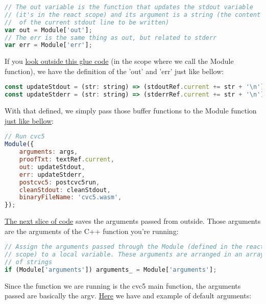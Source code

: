 \documentclass[12pt, a4paper]{article}
\begin{document}
\begin{lstlisting}[language=JavaScript]
// The out variable is the function that updates the stdout variable
// (it's in the react scope) and its argument is a string (the content
//  of the current stdout line to be written)
var out = Module['out'];
// The err is the same thing as out, but related to stderr
var err = Module['err'];
\end{lstlisting}

If you \href{https://github.com/ufmg-smite/proof-visualizer/blob/main/frontend/src/components/VisualizerSmtDrawer/VisualizerSmtDrawer.tsx#L135-L136}{look outside this glue code} (in the scope where we call the Module function), we have the definition of the 'out' and 'err' just like bellow:

\begin{lstlisting}[language=JavaScript]
const updateStdout = (str: string) => (stdoutRef.current += str + '\n');
const updateStderr = (str: string) => (stderrRef.current += str + '\n');
\end{lstlisting}

With that defined, we simply pass those buffer functions to the Module function \href{https://github.com/ufmg-smite/proof-visualizer/blob/main/frontend/src/components/VisualizerSmtDrawer/VisualizerSmtDrawer.tsx#L357-L366}{just like bellow}:
\begin{lstlisting}[language=JavaScript]
// Run cvc5
Module({
    arguments: args,
    proofTxt: textRef.current,
    out: updateStdout,
    err: updateStderr,
    postcvc5: postcvc5run,
    cleanStdout: cleanStdout,
    binaryFileName: 'cvc5.wasm',
});
\end{lstlisting}

\href{https://github.com/ufmg-smite/proof-visualizer/blob/main/frontend/src/wasm/cvc5.js#L124-L127}{The next slice of code} saves the arguments passed from outside. Those arguments are the arguments of the C++ function you're running:

\begin{lstlisting}[language=JavaScript]
// Assign the arguments passed through the Module (defined in the react
// scope) to a local variable. These arguments are arranged in an array
// of strings
if (Module['arguments']) arguments_ = Module['arguments'];
\end{lstlisting}

Since the function we are running is the cvc5 main function, the arguments passed are basically the argv. \href{https://github.com/ufmg-smite/proof-visualizer/blob/main/frontend/src/components/VisualizerSmtDrawer/VisualizerSmtDrawer.tsx#L41-L42}{Here} we have and example of default arguments:
\end{document}
